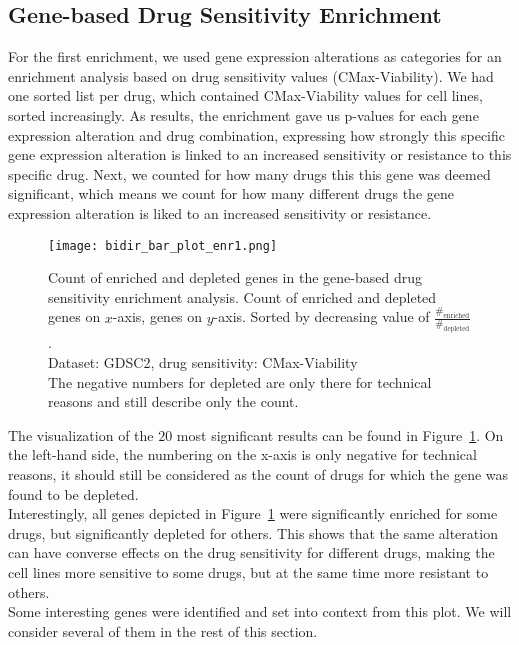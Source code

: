\subsection{Gene-based Drug Sensitivity Enrichment}\label{subsec:bidir_enr1}
For the first enrichment, we used gene expression alterations as categories for an enrichment analysis based on drug sensitivity values (CMax-Viability). We had one sorted list per drug, which contained CMax-Viability values for cell lines, sorted increasingly. As results, the enrichment gave us p-values for each gene expression alteration and drug combination, expressing how strongly this specific gene expression alteration is linked to an increased sensitivity or resistance to this specific drug. Next, we counted for how many drugs this this gene was deemed significant, which means we count for how many different drugs the gene expression alteration is liked to an increased sensitivity or resistance.
\begin{figure}
    \centering
    \texttt{[image: bidir\_bar\_plot\_enr1.png]}
    \caption{Count of enriched and depleted genes in the gene-based drug sensitivity enrichment analysis. Count of enriched and depleted genes on $x$-axis, genes on $y$-axis. Sorted by decreasing value of $\frac{\#_{\text{enriched}}}{\#_{\text{depleted}}}$.\\Dataset: GDSC2, drug sensitivity: CMax-Viability\\The negative numbers for depleted are only there for technical reasons and still describe only the count.}
    \label{fig:bidir_enr1}
\end{figure}
The visualization of the $20$ most significant results can be found in Figure~\ref{fig:bidir_enr1}. On the left-hand side, the numbering on the x-axis is only negative for technical reasons, it should still be considered as the count of drugs for which the gene was found to be depleted.\\
Interestingly, all genes depicted in Figure~\ref{fig:bidir_enr1} were significantly enriched for some drugs, but significantly depleted for others. This shows that the same alteration can have converse effects on the drug sensitivity for different drugs, making the cell lines more sensitive to some drugs, but at the same time more resistant to others.\\
Some interesting genes were identified and set into context from this plot. We will consider several of them in the rest of this section.\\
